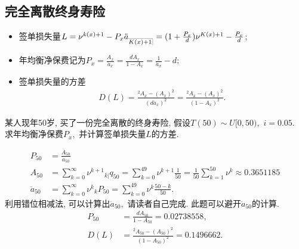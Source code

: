 \documentclass[lang=cn,10pt]{elegantbook}
\makeatletter
\DeclareRobustCommand{\annu}[1]{_{%
    \def\arraystretch{0}%
    \setlength\arraycolsep{1pt}%
    \setlength\arrayrulewidth{.2pt}%
    \begin{array}[b]{@{}c|}\hline
        \\[\arraycolsep]%
        \scriptstyle #1%
    \end{array}%
}}
\makeatother
\begin{document}
\subsection{完全离散终身寿险}
\begin{proposition}
    \begin{itemize}
        \item 签单损失量$L=\nu^{k(x)+1}-P_{x}\ddot{a}_{\annu{K(x)+1}}= (1+\frac{P_{x}}{d})\nu^{K(x)+1}-\frac{P_{x}}{d}$;
        \item 年均衡净保费记为$P_{x}=\frac{A_{x}}{\ddot{a}_{x}}=\frac{dA_{x}}{1-A_{x}}=\frac{1}{\ddot{a}_{x}}-d$;
        \item 签单损失量的方差
        \begin{align*}
        D(L) = \frac{{}^{2}A_{x}-(A_{x})^{2}}{(d\ddot{a}_{x})^{2}}= \frac{{}^{2}A_{x}-(A_{x})^{2}}{(1-A_{x})^{2}}.
        \end{align*}
    \end{itemize}
\end{proposition}

\begin{example}
    某人现年50岁, 买了一份完全离散的终身寿险, 假设$T(50)\sim U[0,50),$ $i=0.05.$ 求年均衡净保费$P_{x},$ 并计算签单损失量$L$的方差.
 \end{example}
 \begin{solution}
 \begin{align*}
 P_{50}&=\frac{A_{50}}{\ddot{a}_{50}}\\
 A_{50}&=\sum^{\infty}_{k=0}\nu^{k+1}{}_{k|}q_{50}=\sum^{49}_{k=0}\nu^{k+1}\frac{1}{50}=\frac{1}{50}\sum^{50}_{k=1}\nu^{k}
 \approx 0.3651185\\
 \ddot{a}_{50}&=\sum^{\infty}_{k=0}\nu^{k}{}_{k}P_{50}=\sum^{49}_{k=0}\nu^{k}\frac{50-k}{50}.
 \end{align*}
 利用错位相减法, 可以计算出$\ddot{a}_{50},$  请读者自己完成. 此题可以避开$\ddot{a}_{50}$的计算.
 \begin{align*}
 P_{50}&=\frac{dA_{50}}{1-A_{50}}=0.02738558,\\
 D(L)&=\frac{^{2}A_{50}-(A_{50})^{2}}{(1-A_{50})^2}= 0.1496662.
 \end{align*}
\end{solution}
\end{document}
